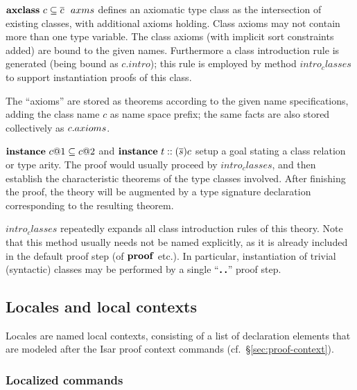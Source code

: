 \begin{descr}

\item [${\mathord{\mathbf{axclass}}}~c \subseteq \overline{c}~~axms$] defines an axiomatic type class as
  the intersection of existing classes, with additional axioms holding.  Class
  axioms may not contain more than one type variable.  The class axioms (with
  implicit sort constraints added) are bound to the given names.  Furthermore
  a class introduction rule is generated (being bound as $c{.}intro$); this
  rule is employed by method $intro_classes$ to support instantiation proofs
  of this class.

  The ``axioms'' are stored as theorems according to the given name
  specifications, adding the class name $c$ as name space prefix; the same
  facts are also stored collectively as $c{\mathord.}axioms$.

\item [${\mathord{\mathbf{instance}}}~c@1 \subseteq c@2$ and ${\mathord{\mathbf{instance}}}~t :: (\overline{s})c$] setup a
  goal stating a class relation or type arity.  The proof would usually
  proceed by $intro_classes$, and then establish the characteristic theorems
  of the type classes involved.  After finishing the proof, the theory will be
  augmented by a type signature declaration corresponding to the resulting
  theorem.

\item [$intro_classes$] repeatedly expands all class introduction rules of
  this theory.  Note that this method usually needs not be named explicitly,
  as it is already included in the default proof step (of ${\mathord{\mathbf{proof}}}$ etc.).
  In particular, instantiation of trivial (syntactic) classes may be performed
  by a single ``$\textbf{.\,.}$'' proof step.

\end{descr}


\subsection{Locales and local contexts}\label{sec:locale}

Locales are named local contexts, consisting of a list of declaration elements
that are modeled after the Isar proof context commands (cf.\
\S\ref{sec:proof-context}).


\subsubsection{Localized commands}

